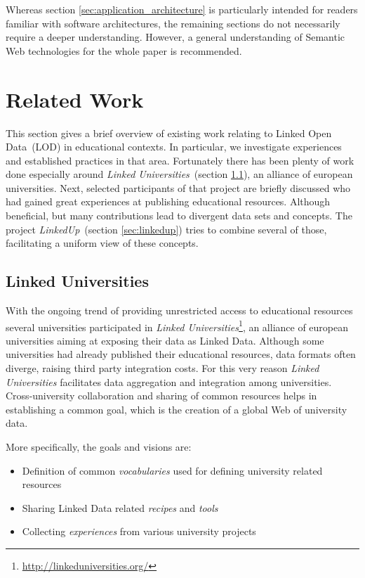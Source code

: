 \documentclass{article}
\begin{document}
Whereas section \ref{sec:application_architecture} is particularly intended for readers familiar with software architectures, the remaining sections do not necessarily require
a deeper understanding. However, a general understanding of Semantic Web technologies for the whole paper is recommended.  


\section{Related Work}
\label{sec:related_work}
This section gives a brief overview of existing work relating to Linked Open Data~(LOD) in educational contexts. In particular, we investigate experiences and established practices in that area. Fortunately there has been plenty of work done especially around \textit{Linked Universities}~(section \ref{sec:linked_universities}), an alliance of european universities. Next, selected participants of that project are briefly discussed who had gained great experiences at publishing educational resources. Although beneficial, but many contributions lead to divergent data sets and concepts. The project \textit{LinkedUp}~(section \ref{sec:linkedup}) tries to combine several of those, facilitating a uniform view of these concepts.

\subsection{Linked Universities}
\label{sec:linked_universities}
With the ongoing trend of providing unrestricted access to educational resources several universities participated in \textit{Linked Universities}\footnote{\url{http://linkeduniversities.org/}}, an alliance of european universities aiming at exposing their data as Linked Data. Although some universities had already published their educational resources, data formats often diverge, raising third party integration costs. For this very reason \textit{Linked Universities} facilitates data aggregation and integration among universities. Cross-university collaboration and sharing of common resources helps in establishing a common goal, which is the creation of a global Web of university data. 

More specifically, the goals and visions are:
\begin{itemize}
	\item Definition of common \textit{vocabularies} used for defining university related resources
	\item Sharing Linked Data related \textit{recipes} and \textit{tools}
	\item Collecting \textit{experiences} from various university projects
\end{itemize}
\end{document}
